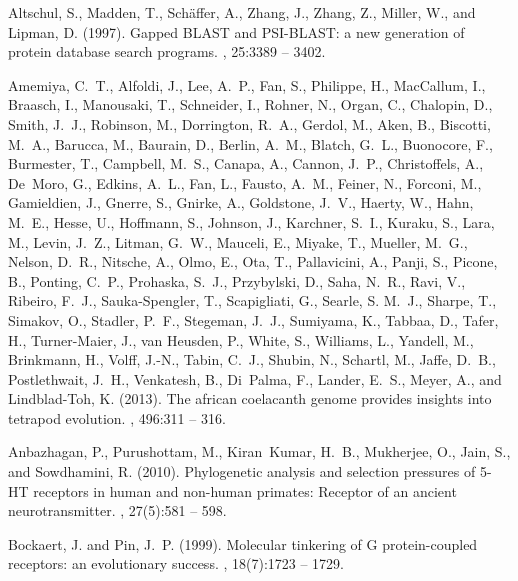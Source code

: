 \documentclass[fleqn,10pt]{wlpeerj}
\begin{document}
\begin{thebibliography}{}

Altschul, S., Madden, T., Schäffer, A., Zhang, J., Zhang, Z., Miller, W., and
  Lipman, D. (1997).
\newblock Gapped {BLAST} and {PSI-BLAST}: a new generation of protein database
  search programs.
, 25:3389 -- 3402.

Amemiya, C.~T., Alfoldi, J., Lee, A.~P., Fan, S., Philippe, H., MacCallum, I.,
  Braasch, I., Manousaki, T., Schneider, I., Rohner, N., Organ, C., Chalopin,
  D., Smith, J.~J., Robinson, M., Dorrington, R.~A., Gerdol, M., Aken, B.,
  Biscotti, M.~A., Barucca, M., Baurain, D., Berlin, A.~M., Blatch, G.~L.,
  Buonocore, F., Burmester, T., Campbell, M.~S., Canapa, A., Cannon, J.~P.,
  Christoffels, A., De~Moro, G., Edkins, A.~L., Fan, L., Fausto, A.~M., Feiner,
  N., Forconi, M., Gamieldien, J., Gnerre, S., Gnirke, A., Goldstone, J.~V.,
  Haerty, W., Hahn, M.~E., Hesse, U., Hoffmann, S., Johnson, J., Karchner,
  S.~I., Kuraku, S., Lara, M., Levin, J.~Z., Litman, G.~W., Mauceli, E.,
  Miyake, T., Mueller, M.~G., Nelson, D.~R., Nitsche, A., Olmo, E., Ota, T.,
  Pallavicini, A., Panji, S., Picone, B., Ponting, C.~P., Prohaska, S.~J.,
  Przybylski, D., Saha, N.~R., Ravi, V., Ribeiro, F.~J., Sauka-Spengler, T.,
  Scapigliati, G., Searle, S. M.~J., Sharpe, T., Simakov, O., Stadler, P.~F.,
  Stegeman, J.~J., Sumiyama, K., Tabbaa, D., Tafer, H., Turner-Maier, J., van
  Heusden, P., White, S., Williams, L., Yandell, M., Brinkmann, H., Volff,
  J.-N., Tabin, C.~J., Shubin, N., Schartl, M., Jaffe, D.~B., Postlethwait,
  J.~H., Venkatesh, B., Di~Palma, F., Lander, E.~S., Meyer, A., and
  Lindblad-Toh, K. (2013).
\newblock The african coelacanth genome provides insights into tetrapod
  evolution.
, 496:311 -- 316.

Anbazhagan, P., Purushottam, M., Kiran~Kumar, H.~B., Mukherjee, O., Jain, S.,
  and Sowdhamini, R. (2010).
\newblock Phylogenetic analysis and selection pressures of {5-HT} receptors in
  human and non-human primates: Receptor of an ancient neurotransmitter.
, 27(5):581 -- 598.

Bockaert, J. and Pin, J.~P. (1999).
\newblock Molecular tinkering of {G} protein-coupled receptors: an evolutionary
  success.
, 18(7):1723 -- 1729.


\end{thebibliography}
\end{document}
